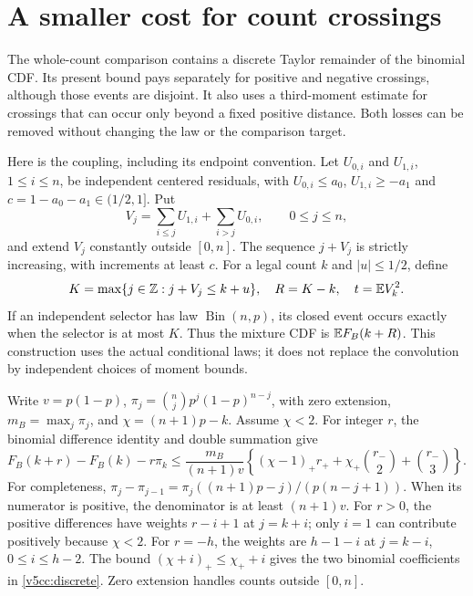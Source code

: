 \section{A smaller cost for count crossings}
\label{v5cc:section}

The whole-count comparison contains a discrete Taylor remainder of the
binomial CDF. Its present bound pays separately for positive and negative
crossings, although those events are disjoint. It also uses a third-moment
estimate for crossings that can occur only beyond a fixed positive distance.
Both losses can be removed without changing the law or the comparison target.

Here is the coupling, including its endpoint convention. Let $U_{0,i}$ and
$U_{1,i}$, $1\le i\le n$, be independent centered residuals, with
$U_{0,i}\le a_0$, $U_{1,i}\ge-a_1$ and
$c=1-a_0-a_1\in(1/2,1]$. Put
\[
 V_j=\sum_{i\le j}U_{1,i}+\sum_{i>j}U_{0,i},\qquad0\le j\le n,
\]
and extend $V_j$ constantly outside $[0,n]$. The sequence $j+V_j$ is
strictly increasing, with increments at least $c$. For a legal count $k$
and $|u|\le1/2$, define
\[
 K=\max\{j\in\mathbb Z:j+V_j\le k+u\},\quad R=K-k,
 \quad t=\mathbb E V_k^2.
\]
If an independent selector has law $\operatorname{Bin}(n,p)$, its closed
event occurs exactly when the selector is at most $K$. Thus the mixture CDF
is $\mathbb E F_B(k+R)$. This construction uses the actual conditional laws; it
does not replace the convolution by independent choices of moment bounds.

Write $v=p(1-p)$, $\pi_j=\binom njp^j(1-p)^{n-j}$, with zero extension,
$m_B=\max_j\pi_j$, and $\chi=(n+1)p-k$. Assume $\chi<2$. For integer $r$,
the binomial difference identity and double summation give
\begin{equation}\label{v5cc:discrete}
 F_B(k+r)-F_B(k)-r\pi_k\le
 \frac{m_B}{(n+1)v}
 \left\{(\chi-1)_+r_++\chi_+\binom{r_-}{2}
                                      +\binom{r_-}{3}\right\}.
\end{equation}
For completeness,
$\pi_j-\pi_{j-1}=\pi_j((n+1)p-j)/(p(n-j+1))$.
When its numerator is positive, the denominator is at least $(n+1)v$.
For $r>0$, the positive differences have weights $r-i+1$ at $j=k+i$;
only $i=1$ can contribute positively because $\chi<2$.
For $r=-h$, the weights are $h-1-i$ at $j=k-i$, $0\le i\le h-2$.
The bound $(\chi+i)_+\le\chi_++i$ gives the two binomial coefficients
in \eqref{v5cc:discrete}. Zero extension handles counts outside $[0,n]$.

